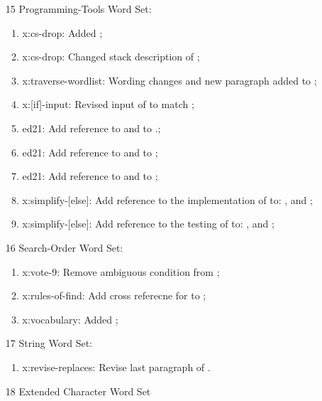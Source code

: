 \begin{itemize}
	\item[15] Programming-Tools Word Set:	%
		\begin{enumerate}
		\item \textsf{x:cs-drop}: Added ;
		\item \textsf{x:cs-drop}: Changed stack description of ;
		\item \textsf{x:traverse-wordlist}: Wording changes and new paragraph added
			to ;
		\item \textsf{x:[if]-input}: Revised input of  to match
			;
		\item \textsf{ed21}: Add reference to \word[tools]{[IF]} and \word[tools]{[THEN]}
			to .;
		\item \textsf{ed21}: Add reference to \word[tools]{[ELSE]} and \word[tools]{[THEN]}
			to ;
		\item \textsf{ed21}: Add reference to \word[tools]{[IF]} and \word[tools]{[ELSE]}
			to ;
		\item \textsf{x:simplify-[else]}: Add reference to the implementation of
			\word[tools]{[ELSE]} to:
			,
			 and
			;
		\item \textsf{x:simplify-[else]}: Add reference to the testing of
			\word[tools]{[THEN]} to:
			,
			 and
			;
		\end{enumerate}
	\item[16] Search-Order Word Set:		%
		\begin{enumerate}
		\item \textsf{x:vote-9}: Remove ambiguous condition from
			;
		\item \textsf{x:rules-of-find}: Add cross referecne for
			 to ;
		\item \textsf{x:vocabulary}: Added ;
		\end{enumerate}
	\item[17] String Word Set:				%
		\begin{enumerate}
		\item \textsf{x:revise-replaces}: Revise last paragraph of .
		\end{enumerate}
	\item[18] Extended Character Word Set	%

\end{itemize}
